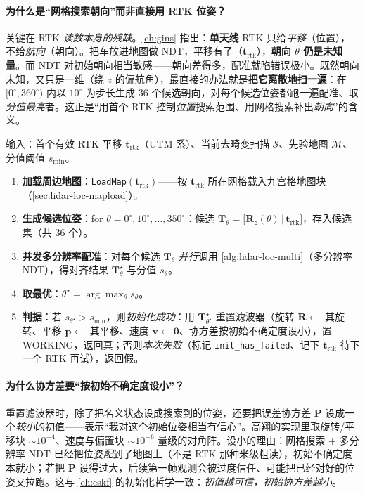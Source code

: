 \paragraph{为什么是“网格搜索朝向”而非直接用 RTK 位姿？}
关键在 RTK \emph{读数本身的残缺}。\cref{ch:gins} 指出：\textbf{单天线} RTK 只给\emph{平移}（位置），不给\emph{航向}（朝向）。把车放进地图做 NDT，平移有了（$\mathbf t_{\mathrm{rtk}}$），\textbf{朝向 $\theta$ 仍是未知量}。而 NDT 对初始朝向相当敏感——朝向差得多，配准就陷错误极小。既然朝向未知，又只是一维（绕 $z$ 的偏航角），最直接的办法就是\textbf{把它离散地扫一遍}：在 $[0^\circ,360^\circ)$ 内以 $10^\circ$ 为步长生成 $36$ 个候选朝向，对每个候选位姿都跑一遍配准、取\emph{分值最高}者。这正是“用首个 RTK 控制\emph{位置}搜索范围、用网格搜索补出\emph{朝向}”的含义。

\begin{algo}\label{alg:lidar-loc-search}
输入：首个有效 RTK 平移 $\mathbf t_{\mathrm{rtk}}$（UTM 系）、当前去畸变扫描 $\mathcal S$、先验地图 $\mathcal M$、分值阈值 $s_{\min}$。
\begin{enumerate}
  \item \textbf{加载周边地图}：\texttt{LoadMap}$(\mathbf t_{\mathrm{rtk}})$——按 $\mathbf t_{\mathrm{rtk}}$ 所在网格载入九宫格地图块（\cref{sec:lidar-loc-mapload}）。
  \item \textbf{生成候选位姿}：for $\theta = 0^\circ,10^\circ,\dots,350^\circ$：候选 $\mathbf T_\theta=\big[\mathbf R_z(\theta)\,\big|\,\mathbf t_{\mathrm{rtk}}\big]$，存入候选集（共 $36$ 个）。
  \item \textbf{并发多分辨率配准}：对每个候选 $\mathbf T_\theta$ \emph{并行}调用 \cref{alg:lidar-loc-multi}（多分辨率 NDT），得对齐结果 $\mathbf T_\theta^\star$ 与分值 $s_\theta$。
  \item \textbf{取最优}：$\theta^\star=\arg\max_\theta s_\theta$。
  \item \textbf{判据}：若 $s_{\theta^\star} > s_{\min}$，则\emph{初始化成功}：用 $\mathbf T_{\theta^\star}^\star$ 重置滤波器（旋转 $\mathbf R\!\leftarrow$ 其旋转、平移 $\mathbf p\!\leftarrow$ 其平移、速度 $\mathbf v\!\leftarrow\mathbf 0$、协方差按初始不确定度设小），置 \textsf{WORKING}，返回真；否则\emph{本次失败}（标记 \texttt{init\_has\_failed}、记下 $\mathbf t_{\mathrm{rtk}}$ 待下一个 RTK 再试），返回假。
\end{enumerate}
\end{algo}

\paragraph{为什么协方差要“按初始不确定度设小”？}
重置滤波器时，除了把名义状态设成搜索到的位姿，还要把误差协方差 $\mathbf P$ 设成一个\emph{较小}的初值——表示“我对这个初始位姿相当有信心”。高翔的实现里取旋转/平移块 $\sim10^{-4}$、速度与偏置块 $\sim10^{-6}$ 量级的对角阵。设小的理由：网格搜索 + 多分辨率 NDT 已经把位姿\emph{配}到了地图上（不是 RTK 那种米级粗读），初始不确定度本就小；若把 $\mathbf P$ 设得过大，后续第一帧观测会被过度信任、可能把已经对好的位姿又拉跑。这与 \cref{ch:eskf} 的初始化哲学一致：\emph{初值越可信，初始协方差越小}。

